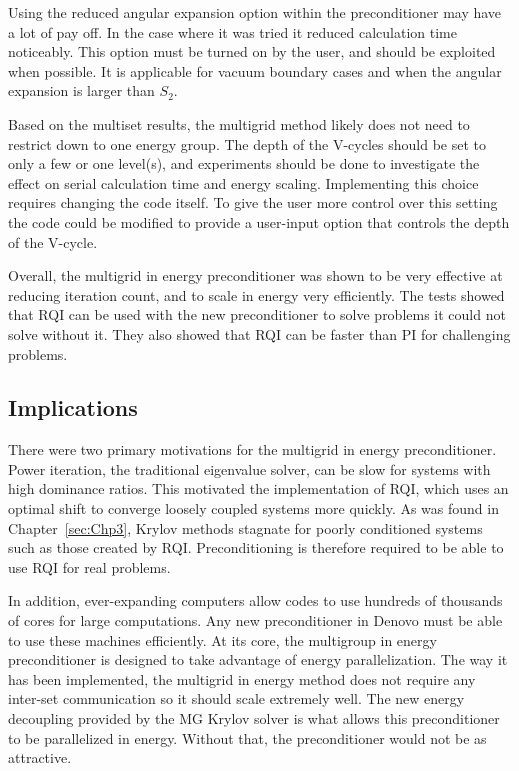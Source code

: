Using the reduced angular expansion option within the preconditioner may have a lot of pay off. In the case where it was tried it reduced calculation time noticeably. This option must be turned on by the user, and should be exploited when possible. It is applicable for vacuum boundary cases and when the angular expansion is larger than $S_{2}$.

Based on the multiset results, the multigrid method likely does not need to restrict down to one energy group. The depth of the V-cycles should be set to only a few or one level(s), and experiments should be done to investigate the effect on serial calculation time and energy scaling. Implementing this choice requires changing the code itself. To give the user more control over this setting the code could be modified to provide a user-input option that controls the depth of the V-cycle.

Overall, the multigrid in energy preconditioner was shown to be very effective at reducing iteration count, and to scale in energy very efficiently. The tests showed that RQI can be used with the new preconditioner to solve problems it could not solve without it. They also showed that RQI can be faster than PI for challenging problems. 

\subsection{Implications}
There were two primary motivations for the multigrid in energy preconditioner. Power iteration, the traditional eigenvalue solver, can be slow for systems with high dominance ratios. This motivated the implementation of RQI, which uses an optimal shift to converge loosely coupled systems more quickly. As was found in Chapter~\ref{sec:Chp3}, Krylov methods stagnate for poorly conditioned systems such as those created by RQI. Preconditioning is therefore required to be able to use RQI for real problems. 

In addition, ever-expanding computers allow codes to use hundreds of thousands of cores for large computations. Any new preconditioner in Denovo must be able to use these machines efficiently. At its core, the multigroup in energy preconditioner is designed to take advantage of energy parallelization. The way it has been implemented, the multigrid in energy method does not require any inter-set communication so it should scale extremely well. The new energy decoupling provided by the MG Krylov solver is what allows this preconditioner to be parallelized in energy. Without that, the preconditioner would not be as attractive. 

